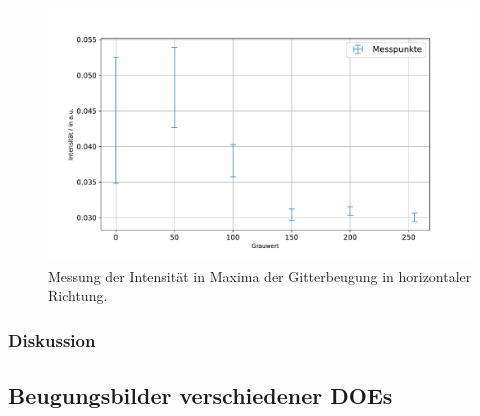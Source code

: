 \documentclass[
	a4paper,
	12pt,
	pagesize,
	ngerman
]{scrartcl}
\begin{document}
\begin{figure}[H]
			\includegraphics[width=0.8\linewidth]{img/sinc2}
			\caption{
			Messung der Intensität in Maxima der Gitterbeugung in horizontaler Richtung.
			}
			\label{fig_sinc2}
	\end{figure}


			\subsubsection*{Diskussion}

		\subsection{Beugungsbilder verschiedener DOEs}
\end{document}
